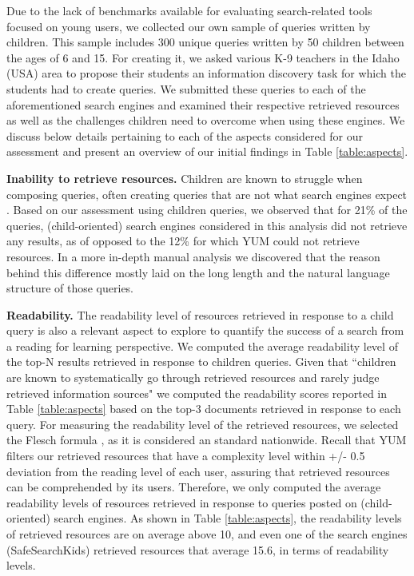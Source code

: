 \documentclass{sig-alternate-05-2015}
\begin{document}
Due to the lack of benchmarks available for evaluating search-related tools focused on young users, we collected our own sample of queries written by children. This sample includes 300 unique queries written by 50 children between the ages of 6 and 15. For creating it, we asked various K-9   teachers in the Idaho (USA) area to propose their students an information discovery task for which the students had to create queries. We submitted these queries to each of the aforementioned search engines and examined their respective retrieved resources as well as the challenges children need to overcome when using these engines. We discuss below details pertaining to each of the aspects  considered for our assessment and present an overview of our initial findings  in Table \ref{table:aspects}. 





\noindent
\textbf{Inability to retrieve resources.} Children are known to struggle when composing queries, often creating queries that are not what search engines expect \cite{Rie16}. Based on our assessment using children queries, we observed that for  21\% of the queries, (child-oriented) search engines considered in this analysis did not retrieve any results, as of opposed to the 12\% for which YUM could not retrieve resources. In a more in-depth manual analysis we discovered that the reason behind this difference mostly laid on the long length and the natural language structure of those queries.

\noindent
\textbf{Readability.} The readability level of resources retrieved in response to a child query is also a relevant aspect to explore to quantify the success of a search from a reading for learning perspective. We computed the average readability level of the top-N results retrieved in response to children queries. Given that ``children are known to systematically go through retrieved resources and rarely judge retrieved information sources" \cite{Rie16} we computed the readability scores reported in Table \ref{table:aspects} based on the top-3 documents retrieved in response to each query. For measuring the readability level of the retrieved resources, we selected the Flesch formula \cite{Fle48}, as it is considered an standard nationwide. Recall that YUM filters our retrieved resources that have a complexity level within +/- 0.5 deviation from the reading level of each user, assuring that retrieved resources can be comprehended by its users.   Therefore, we only computed the average readability levels of resources retrieved in response to queries posted on (child-oriented) search engines. As shown in Table \ref{table:aspects}, the readability levels of retrieved resources are on average above 10, and even one of the search engines (SafeSearchKids) retrieved resources that average 15.6, in terms of readability levels. 
\end{document}
